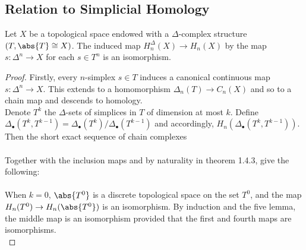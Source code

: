\documentclass[a4paper]{article}
\begin{document}
\subsection{Relation to Simplicial Homology}
\begin{thm}{}{} Let $X$ be a topological space endowed with a $\Delta$-complex structure $(T,\abs{T}\cong X)$. The induced map $H_n^\Delta(X)\to H_n(X)$ by the map $s:\Delta^n\to X$ for each $s\in T^n$ is an isomorphism. 
\begin{proof}
Firstly, every $n$-simplex $s\in T$ induces a canonical continuous map $s:\Delta^n\to X$. This extends to a homomorphism $\Delta_n(T)\to C_n(X)$ and so to a chain map and descends to homology. \\

Denote $T^k$ the $\Delta$-sets of simplices in $T$ of dimension at most $k$. Define $\Delta_\bullet(T^k,T^{k-1})=\Delta_\bullet(T^k)/\Delta_\bullet(T^{k-1})$ and accordingly, $H_n(\Delta_\bullet(T^k,T^{k-1}))$. Then the short exact sequence of chain complexes \\
 \\
Together with the inclusion maps and by naturality in theorem 1.4.3, give the following: \\
 \\
When $k=0$, $\abs{T^0}$ is a discrete topological space on the set $T^0$, and the map $H_n(T^0)\to H_n(\abs{T^0})$ is an isomorphism. By induction and the five lemma, the middle map is an isomorphism provided that the first and fourth maps are isomorphisms. \\


\end{proof}
\end{thm}
\end{document}
